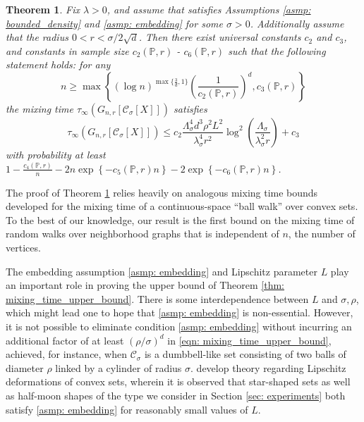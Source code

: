 \documentclass[11pt,twoside]{article}
\newtheorem{theorem}{Theorem}
\newcommand{\set}[1]{\left\{#1\right\}}
\newcommand{\1}{\mathbf{1}}
\newcommand{\Xbf}{X}             %
\newcommand{\Pbb}{\mathbb{P}}
\newcommand{\Cbb}{\mathbb{C}}
\newcommand{\Cset}{\mathcal{C}}
\newcommand{\Csig}{\Cset_{\sigma}}
\begin{document}
\begin{theorem}
  \label{thm: mixing_time_upper_bound}
  Fix $\lambda > 0$, and assume that \smash{$\Cset \in \Cbb_f(\lambda)$}
  satisfies Assumptions \ref{asmp: bounded_density} and \ref{asmp: embedding}
  for some $\sigma > 0$. Additionally assume that the radius $0 < r < \sigma/2\sqrt{d}$. Then there exist universal constants $c_2$ and $c_3$, and constants in sample size $c_2(\Pbb,r)$ - $c_6(\Pbb,r)$ such that the following statement holds: for any
  \begin{equation*}
  n \geq \max\left\{(\log n)^{\max\{\frac{3}{d},1\}}\left(\frac{1}{c_2(\Pbb,r)}\right)^d, c_3(\Pbb,r)\right\}
  \end{equation*}
  the mixing time $\tau_{\infty}(G_{n,r}[\Csig[\Xbf]])$ satisfies
  \begin{equation} 
    \label{eqn: mixing_time_upper_bound}
    \tau_{\infty}(G_{n,r}[\Csig[\Xbf]]) \leq c_2 \frac{\Lambda_{\sigma}^4 d^3 \rho^2 L^2}{\lambda_{\sigma}^4 r^2} \log^2\left(\frac{ \Lambda_{\sigma}}{\lambda_{\sigma}^2 r}\right) + c_3
  \end{equation}
  with probability at least $1 - \frac{c_4(\Pbb,r)}{n} - 2n\exp\set{-c_5(\Pbb,r)n} - 2\exp\set{-c_6(\Pbb,r)n}$.
\end{theorem}

The proof of Theorem \ref{thm: mixing_time_upper_bound} relies heavily on
analogous mixing time bounds developed for the mixing time of a
continuous-space ``ball walk'' over convex sets. To the best of our knowledge, our
result is the first bound on the mixing time of random walks
over neighborhood graphs that is independent of $n$, the number of vertices.   

\vspace{0.2cm}

  The embedding assumption \ref{asmp: embedding} and Lipschitz parameter $L$
  play an important role in proving the upper bound of Theorem \ref{thm:
    mixing_time_upper_bound}. There is some interdependence between $L$ and
  $\sigma,\rho$, which might lead one to hope that \ref{asmp: embedding} is
  non-essential. However, it is not possible to eliminate condition \ref{asmp:
    embedding} without incurring an additional factor of at least
  $(\rho/\sigma)^d$ in \eqref{eqn: mixing_time_upper_bound}, achieved, for
  instance, when $\Csig$ is a dumbbell-like set consisting of two balls of
  diameter $\rho$ linked by a cylinder of radius
  $\sigma$. \citet{abbasi-yadkori2016, abbasi-yadkori2016a}  
  develop theory regarding Lipschitz deformations of convex sets, wherein it
  is observed that star-shaped sets as well as half-moon shapes of the type we
  consider in Section \ref{sec: experiments} both satisfy \ref{asmp: embedding}
  for reasonably small values of $L$. 
  
\end{document}
